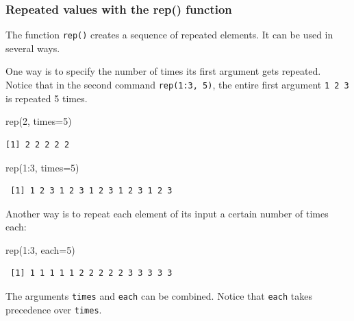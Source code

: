 \documentclass[
  13,
  letterpaper,
]{report}
\newenvironment{Shaded}{\begin{snugshade}}{\end{snugshade}}
\newcommand{\AttributeTok}[1]{\textcolor[rgb]{0.40,0.45,0.13}{#1}}
\newcommand{\DecValTok}[1]{\textcolor[rgb]{0.68,0.00,0.00}{#1}}
\newcommand{\FunctionTok}[1]{\textcolor[rgb]{0.28,0.35,0.67}{#1}}
\newcommand{\NormalTok}[1]{\textcolor[rgb]{0.00,0.23,0.31}{#1}}
\newcommand{\SpecialCharTok}[1]{\textcolor[rgb]{0.37,0.37,0.37}{#1}}
\begin{document}
\subsubsection{Repeated values with the rep()
function}\label{sec-05-make-seq-rep}

The function \texttt{rep()} creates a sequence of repeated elements. It
can be used in several ways.

One way is to specify the number of times its first argument gets
repeated. Notice that in the second command \texttt{rep(1:3,\ 5)}, the
entire first argument \texttt{1\ 2\ 3} is repeated 5 times.

\begin{Shaded}
\begin{Highlighting}[]
\FunctionTok{rep}\NormalTok{(}\DecValTok{2}\NormalTok{, }\AttributeTok{times=}\DecValTok{5}\NormalTok{)}
\end{Highlighting}
\end{Shaded}

\begin{verbatim}
[1] 2 2 2 2 2
\end{verbatim}

\begin{Shaded}
\begin{Highlighting}[]
\FunctionTok{rep}\NormalTok{(}\DecValTok{1}\SpecialCharTok{:}\DecValTok{3}\NormalTok{, }\AttributeTok{times=}\DecValTok{5}\NormalTok{)}
\end{Highlighting}
\end{Shaded}

\begin{verbatim}
 [1] 1 2 3 1 2 3 1 2 3 1 2 3 1 2 3
\end{verbatim}

Another way is to repeat each element of its input a certain number of
times each:

\begin{Shaded}
\begin{Highlighting}[]
\FunctionTok{rep}\NormalTok{(}\DecValTok{1}\SpecialCharTok{:}\DecValTok{3}\NormalTok{, }\AttributeTok{each=}\DecValTok{5}\NormalTok{)}
\end{Highlighting}
\end{Shaded}

\begin{verbatim}
 [1] 1 1 1 1 1 2 2 2 2 2 3 3 3 3 3
\end{verbatim}

The arguments \texttt{times} and \texttt{each} can be combined. Notice
that \texttt{each} takes precedence over \texttt{times}.
\end{document}
